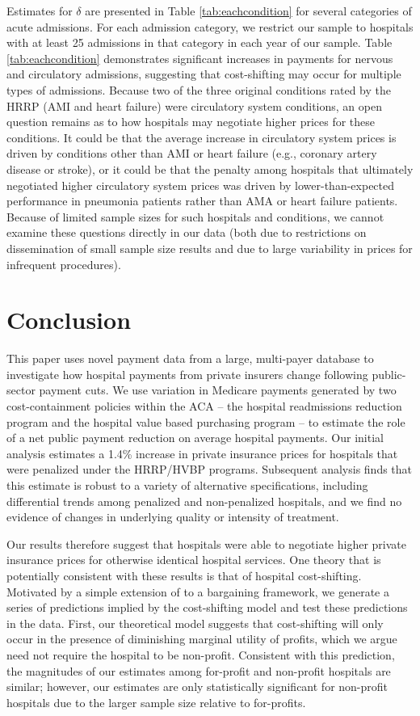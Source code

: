 \documentclass[12pt]{article}
\begin{document}
Estimates for $\delta$ are presented in Table \ref{tab:eachcondition} for several categories of acute admissions. For each admission category, we restrict our sample to hospitals with at least 25 admissions in that category in each year of our sample. Table \ref{tab:eachcondition} demonstrates significant increases in payments for nervous and circulatory admissions, suggesting that cost-shifting may occur for multiple types of admissions. Because two of the three original conditions rated by the HRRP (AMI and heart failure) were circulatory system conditions, an open question remains as to how hospitals may negotiate higher prices for these conditions. It could be that the average increase in circulatory system prices is driven by conditions other than AMI or heart failure (e.g., coronary artery disease or stroke), or it could be that the penalty among hospitals that ultimately negotiated higher circulatory system prices was driven by lower-than-expected performance in pneumonia patients rather than AMA or heart failure patients. Because of limited sample sizes for such hospitals and conditions, we cannot examine these questions directly in our data (both due to restrictions on dissemination of small sample size results and due to large variability in prices for infrequent procedures).

\section{Conclusion}
\label{sec:Conclusion}
This paper uses novel payment data from a large, multi-payer database to investigate how hospital payments from private insurers change following public-sector payment cuts. We use variation in Medicare payments generated by two cost-containment policies within the ACA -- the hospital readmissions reduction program and the hospital value based purchasing program -- to estimate the role of a net public payment reduction on average hospital payments. Our initial analysis estimates a 1.4\% increase in private insurance prices for hospitals that were penalized under the HRRP/HVBP programs. Subsequent analysis finds that this estimate is robust to a variety of alternative specifications, including differential trends among penalized and non-penalized hospitals, and we find no evidence of changes in underlying quality or intensity of treatment.

Our results therefore suggest that hospitals were able to negotiate higher private insurance prices for otherwise identical hospital services. One theory that is potentially consistent with these results is that of hospital cost-shifting. Motivated by a simple extension of \cite{dranove1988} to a bargaining framework, we generate a series of predictions implied by the cost-shifting model and test these predictions in the data. First, our theoretical model suggests that cost-shifting will only occur in the presence of diminishing marginal utility of profits, which we argue need not require the hospital to be non-profit. Consistent with this prediction, the magnitudes of our estimates among for-profit and non-profit hospitals are similar; however, our estimates are only statistically significant for non-profit hospitals due to the larger sample size relative to for-profits.
\end{document}
